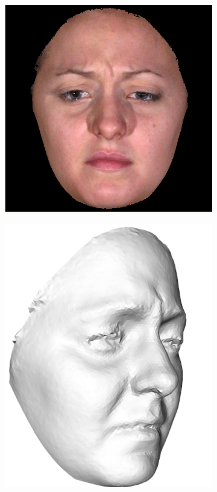 \begin{figure}[H]
   \centering
   \begin{subfigure}{0.23\textwidth}
       \includegraphics[width=0.8\linewidth]{Images/BU3DFE_rgb.png}
       \caption{}
       \label{BU3DFE_img_a}
   \end{subfigure}
   \begin{subfigure}{0.23\textwidth}
       \includegraphics[width=0.8\linewidth]{Images/BU3DFE_mesh.png}

\end{subfigure}
\end{figure}
